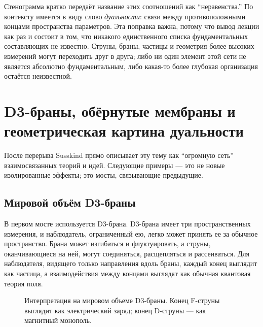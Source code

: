 Стенограмма кратко передаёт название этих соотношений как ``неравенства.'' По контексту имеется в виду слово \emph{дуальности}: связи между противоположными концами пространства параметров. Эта поправка важна, потому что вывод лекции как раз и состоит в том, что никакого единственного списка фундаментальных составляющих не известно. Струны, браны, частицы и геометрия более высоких измерений могут переходить друг в друга; либо ни один элемент этой сети не является абсолютно фундаментальным, либо какая-то более глубокая организация остаётся неизвестной.

\section{D3-браны, обёрнутые мембраны и геометрическая картина дуальности}

После перерыва Susskind прямо описывает эту тему как ``огромную сеть'' взаимосвязанных теорий и идей. Следующие примеры — это не новые изолированные эффекты; это мосты, связывающие предыдущие.

\subsection{Мировой объём D3-браны}

В первом мосте используется D3-брана. D3-брана имеет три пространственных измерения, и наблюдатель, ограниченный ею, легко может принять ее за обычное пространство. Брана может изгибаться и флуктуировать, а струны, оканчивающиеся на ней, могут соединяться, расщепляться и рассеиваться. Для наблюдателя, видящего только направления вдоль браны, каждый конец выглядит как частица, а взаимодействия между концами выглядят как обычная квантовая теория поля.

\begin{figure}[htbp]
\centering
{}%
\caption{Интерпретация на мировом объеме D3-браны. Конец F-струны выглядит как электрический заряд; конец D-струны — как магнитный монополь.}
\end{figure}

